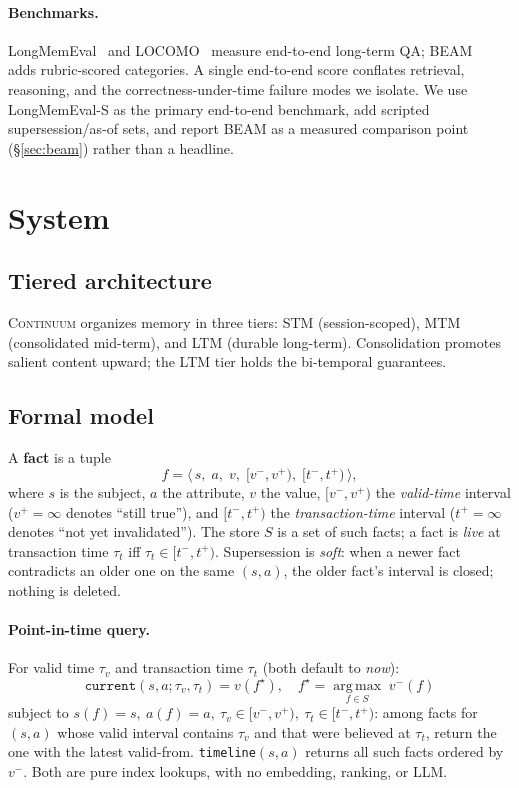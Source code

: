\documentclass[11pt]{article}
\newcommand{\code}[1]{\texttt{#1}}
\begin{document}
\paragraph{Benchmarks.} LongMemEval~\cite{longmemeval} and LOCOMO~\cite{locomo} measure end-to-end
long-term QA; BEAM~\cite{beam} adds rubric-scored categories. A single end-to-end score conflates
retrieval, reasoning, and the correctness-under-time failure modes we isolate. We use LongMemEval-S
as the primary end-to-end benchmark, add scripted supersession/as-of sets, and report BEAM as a
measured comparison point (\S\ref{sec:beam}) rather than a headline.

\section{System}

\subsection{Tiered architecture}
\textsc{Continuum} organizes memory in three tiers: STM (session-scoped), MTM (consolidated
mid-term), and LTM (durable long-term). Consolidation promotes salient content upward; the LTM tier
holds the bi-temporal guarantees.

\subsection{Formal model}\label{sec:formal}
A \textbf{fact} is a tuple
\[
  f = \big\langle\, s,\; a,\; v,\; [v^-, v^+),\; [t^-, t^+) \,\big\rangle,
\]
where $s$ is the subject, $a$ the attribute, $v$ the value, $[v^-,v^+)$ the \emph{valid-time}
interval ($v^+=\infty$ denotes ``still true''), and $[t^-,t^+)$ the \emph{transaction-time}
interval ($t^+=\infty$ denotes ``not yet invalidated''). The store $S$ is a set of such facts; a
fact is \emph{live} at transaction time $\tau_t$ iff $\tau_t \in [t^-, t^+)$. Supersession is
\emph{soft}: when a newer fact contradicts an older one on the same $(s,a)$, the older fact's
interval is closed; nothing is deleted.

\paragraph{Point-in-time query.} For valid time $\tau_v$ and transaction time $\tau_t$ (both default
to \emph{now}):
\[
  \code{current}(s,a;\tau_v,\tau_t) = v(f^\star), \quad
  f^\star = \operatorname*{arg\,max}_{f \in S}\; v^-(f)
\]
subject to $s(f){=}s,\ a(f){=}a,\ \tau_v \in [v^-,v^+),\ \tau_t \in [t^-,t^+)$: among facts for
$(s,a)$ whose valid interval contains $\tau_v$ and that were believed at $\tau_t$, return the one
with the latest valid-from. \code{timeline}$(s,a)$ returns all such facts ordered by $v^-$. Both are
pure index lookups, with no embedding, ranking, or LLM.
\end{document}
